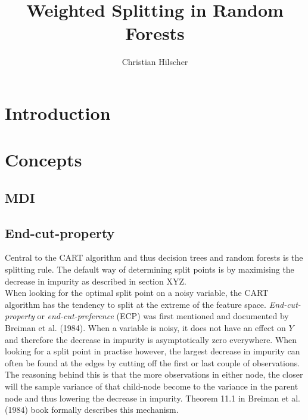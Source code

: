 \documentclass{article}
\title{Weighted Splitting in Random Forests}
\author{Christian Hilscher}
\begin{document}
\maketitle

\section{Introduction}





\section{Concepts}

\subsection{MDI}



\subsection{End-cut-property}

Central to the CART algorithm and thus decision trees and random forests is the splitting rule. The default way of determining split points is by maximising the decrease in impurity as described in section XYZ. \\
When looking for the optimal split point on a noisy variable, the CART algorithm has the tendency to split at the extreme of the feature space. \textit{End-cut-property} or \textit{end-cut-preference} (ECP) was first mentioned and documented by Breiman et al. (1984). When a variable is noisy, it does not have an effect on $Y$ and therefore the decrease in impurity is asymptotically zero everywhere. When looking for a split point in practise however, the largest decrease in impurity can often be found at the edges by cutting off the first or last couple of observations. The reasoning behind this is that the more observations in either node, the closer will the sample variance of that child-node become to the variance in the parent node and thus lowering the decrease in impurity. Theorem 11.1 in Breiman et al. (1984) book formally describes this mechanism. \\
\end{document}
